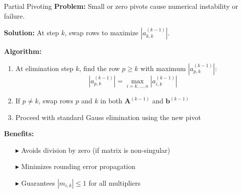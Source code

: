 \documentclass[aspectratio=169]{beamer}
\begin{document}
\begin{frame}{Partial Pivoting}
	\vspace{-0.4cm}
	\textbf{Problem:} Small or zero pivots cause numerical instability or failure.

	\vspace{-0.2cm}
	\textbf{Solution:} At step $k$, swap rows to maximize $|a_{k,k}^{(k-1)}|$.

	\vspace{-0.3cm}
	\alert{\textbf{Algorithm:}}
	\begin{enumerate}
		\item At elimination step $k$, find the row $p \geq k$ with maximum $|a_{p,k}^{(k-1)}|$:
		      \begin{equation*}
			      |a_{p,k}^{(k-1)}| = \max_{i=k,\ldots,n} |a_{i,k}^{(k-1)}|
		      \end{equation*}

		\item If $p \neq k$, swap rows $p$ and $k$ in both $\mathbf{A}^{(k-1)}$ and $\mathbf{b}^{(k-1)}$

		\item Proceed with standard Gauss elimination using the new pivot
	\end{enumerate}

	\vspace{0.1cm}
	\textbf{Benefits:}
	\begin{itemize}
		\item[$\blacktriangleright$] Avoids division by zero (if matrix is non-singular)
		\item[$\blacktriangleright$] Minimizes rounding error propagation
		\item[$\blacktriangleright$] Guarantees $|m_{i,k}| \leq 1$ for all multipliers
	\end{itemize}
\end{frame}
\end{document}
